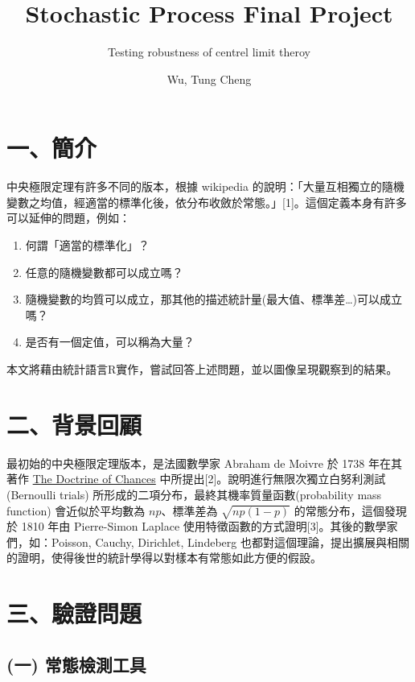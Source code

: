 \documentclass[]{article}
\title{Stochastic Process Final Project}
\subtitle{Testing robustness of centrel limit theroy}
\author{Wu, Tung Cheng}
\date{}
\providecommand{\tightlist}{%
  \setlength{\itemsep}{0pt}\setlength{\parskip}{0pt}}
\begin{document}
\maketitle

\section{一、簡介}

中央極限定理有許多不同的版本，根據 wikipedia
的說明：「大量互相獨立的隨機變數之均值，經適當的標準化後，依分布收斂於常態。」{[}1{]}。這個定義本身有許多可以延伸的問題，例如：

\begin{enumerate}
\def\labelenumi{\arabic{enumi}.}
\tightlist
\item
  何謂「適當的標準化」？
\item
  任意的隨機變數都可以成立嗎？
\item
  隨機變數的均質可以成立，那其他的描述統計量(最大值、標準差\ldots{})可以成立嗎？
\item
  是否有一個定值，可以稱為大量？
\end{enumerate}

本文將藉由統計語言R實作，嘗試回答上述問題，並以圖像呈現觀察到的結果。

\section{二、背景回顧}

最初始的中央極限定理版本，是法國數學家 Abraham de Moivre 於 1738
年在其著作
\href{https://books.google.com.tw/books?id=PII_AAAAcAAJ\&hl=zh-TW\&pg=PA235\#v=onepage\&q\&f=false}{The
Doctrine of Chances} 中所提出{[}2{]}。說明進行無限次獨立白努利測試
(Bernoulli trials) 所形成的二項分布，最終其機率質量函數(probability mass
function) 會近似於平均數為 \(np\)、標準差為 \(\sqrt{np(1-p)}\)
的常態分布，這個發現於 1810 年由 Pierre-Simon Laplace
使用特徵函數的方式證明{[}3{]}。其後的數學家們，如：Poisson, Cauchy,
Dirichlet, Lindeberg
也都對這個理論，提出擴展與相關的證明，使得後世的統計學得以對樣本有常態如此方便的假設。

\section{三、驗證問題}

\hypertarget{-}{%
\subsection{(一) 常態檢測工具}\label{-}}
\end{document}
